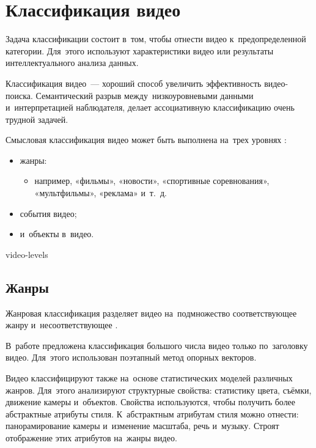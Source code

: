 

\section{Классификация видео}

Задача классификации состоит в~том,
чтобы отнести видео к~предопределенной категории.
Для~этого используют характеристики видео или
результаты интеллектуального анализа данных.

Классификация видео~— хороший способ увеличить
эффективность видео-поиска.
Семантический разрыв между~низкоуровневыми данными
и~интерпретацией наблюдателя, делает ассоциативную классификацию
очень трудной задачей.

Смысловая классификация видео может быть выполнена
на~трех уровнях \cite{Tamizharasan:2013}:
\begin{itemize}
    \item жанры:
    \begin{itemize}
        \item например, «фильмы», «новости»,
                «спортивные соревнования», «мультфильмы», «реклама» и~т.~д.
    \end{itemize}
    \item события видео;
    \item и~объекты в~видео.
\end{itemize}


\begin{figuredt}
    {video-levels}
\end{figuredt}



\subsection{Жанры}

Жанровая классификация разделяет видео на~подмножество соответствующее жанру
и~несоответствующее \cite{Wu:2012}.

В~работе \cite{Jiang:2007} предложена классификация большого числа
видео только по~заголовку видео.
Для~этого использован поэтапный метод опорных
векторов.

Видео классифицируют также на~основе статистических моделей различных жанров.
Для~этого анализируют структурные свойства:
статистику цвета, съёмки, движение камеры и~объектов.
Свойства используются, чтобы получить более абстрактные атрибуты стиля.
К~абстрактным атрибутам стиля можно отнести:
панорамирование камеры и~изменение масштаба, речь и~музыку.
Строят отображение этих атрибутов на~жанры видео.


